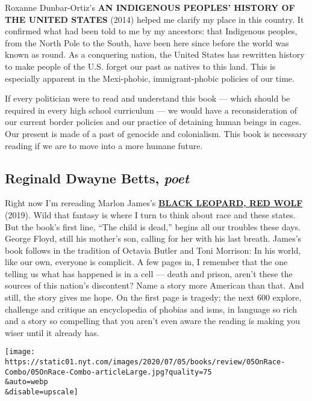 Roxanne Dunbar-Ortiz's \textbf{AN INDIGENOUS PEOPLES' HISTORY OF THE
UNITED STATES} (2014) helped me clarify my place in this country. It
confirmed what had been told to me by my ancestors: that Indigenous
peoples, from the North Pole to the South, have been here since before
the world was known as round. As a conquering nation, the United States
has rewritten history to make people of the U.S. forget our past as
natives to this land. This is especially apparent in the Mexi-phobic,
immigrant-phobic policies of our time.

If every politician were to read and understand this book --- which
should be required in every high school curriculum --- we would have a
reconsideration of our current border policies and our practice of
detaining human beings in cages. Our present is made of a past of
genocide and colonialism. This book is necessary reading if we are to
move into a more humane future.

\hypertarget{reginald-dwayne-betts-poet}{%
\subsection{\texorpdfstring{Reginald Dwayne Betts,
\emph{poet}}{Reginald Dwayne Betts, poet}}\label{reginald-dwayne-betts-poet}}

Right now I'm rereading Marlon James's
\textbf{\href{https://www.nytimes.com/2019/01/31/books/review/black-leopard-red-wolf-marlon-james.html}{BLACK
LEOPARD, RED WOLF}} (2019). Wild that fantasy is where I turn to think
about race and these states. But the book's first line, ``The child is
dead,'' begins all our troubles these days. George Floyd, still his
mother's son, calling for her with his last breath. James's book follows
in the tradition of Octavia Butler and Toni Morrison: In his world, like
our own, everyone is complicit. A few pages in, I remember that the one
telling us what has happened is in a cell --- death and prison, aren't
these the sources of this nation's discontent? Name a story more
American than that. And still, the story gives me hope. On the first
page is tragedy; the next 600 explore, challenge and critique an
encyclopedia of phobias and isms, in language so rich and a story so
compelling that you aren't even aware the reading is making you wiser
until it already has.

\texttt{[image: https://static01.nyt.com/images/2020/07/05/books/review/05OnRace-Combo/05OnRace-Combo-articleLarge.jpg?quality=75\\\&auto=webp\\\&disable=upscale]}

